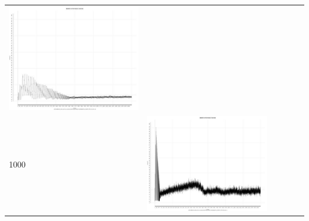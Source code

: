 \begin{table}[htbp]
{\begin{tabular}{l | ccccc}
\begin{minipage}{.15\textwidth}
     			 	\includegraphics[width=\linewidth]{images/mema-graph/I10}
    				 \end{minipage}\\	
		1000   &	 \begin{minipage}{.15\textwidth}
     			 	\includegraphics[width=\linewidth]{images/mema-graph/I4}
    				 \end{minipage}
    			   &	 \begin{minipage}{.15\textwidth}

\end{minipage}
\end{tabular}}
\end{table}

